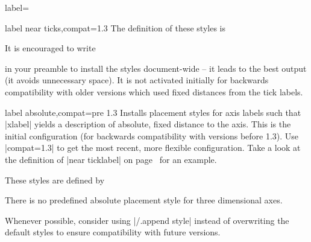 \begin{pgfplotsxykey}{\x label=}
\begin{pgfplotsxykeylist}{\x label near ticks,compat=1.3}
	The definition of these styles is
\begin{codeexample}
\end{codeexample}
	
	It is encouraged to write
\begin{codeexample}
\pgfplotsset{compat=1.3} %
\end{codeexample}
	\noindent in your preamble to install the styles document-wide -- it leads to the best output (it avoids unnecessary space). It is not activated initially for backwards compatibility with older versions which used fixed distances from the tick labels.
\end{pgfplotsxykeylist}

\begin{pgfplotsxykeylist}{\x label absolute,compat=pre 1.3}
	Installs placement styles for axis labels such that |xlabel| yields a description of absolute, fixed distance to the axis. This is the initial configuration (for backwards compatibility with versions before 1.3). Use |compat=1.3| to get the most recent, more flexible configuration. Take a look at the definition of |near ticklabel| on page~\pageref{key:near:ticklabel} for an example.

	These styles are defined by
\begin{codeexample}
\end{codeexample}

	There is no predefined absolute placement style for three dimensional axes.
\end{pgfplotsxykeylist}

Whenever possible, consider using |/.append style| instead of overwriting the default styles to ensure compatibility with future versions.
\begin{codeexample}
\end{codeexample}
\end{pgfplotsxykey}

